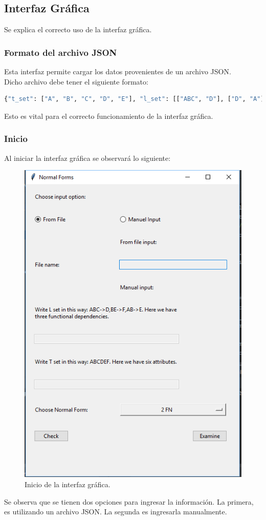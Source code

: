 \documentclass[a4paper,12pt]{article}
\begin{document}
{\subsection{Interfaz Gráfica}

Se explica el correcto uso de la interfaz gráfica.\\

\subsubsection{Formato del archivo JSON}

Esta interfaz permite cargar los datos provenientes de un archivo JSON. 
\\
Dicho archivo debe tener el siguiente formato:

\begin{lstlisting}[language=python, caption={Archivo JSON de relación de ejemplo.\\\hspace{\textwidth}}, captionpos=t]
{"t_set": ["A", "B", "C", "D", "E"], "l_set": [["ABC", "D"], ["D", "A"]]}
\end{lstlisting}

Esto es vital para el correcto funcionamiento de la interfaz gráfica.

\subsubsection{Inicio}

Al iniciar la interfaz gráfica se observará lo siguiente:

\begin{figure}[H]
\centering
  \includegraphics[width=0.3\linewidth]{Images/inicio.png}
  \caption{Inicio de la interfaz gráfica.}
  \label{fig:neurona1}
\end{figure}

Se observa que se tienen dos opciones para ingresar la información. La primera, es utilizando un archivo JSON. La segunda es ingresarla manualmente.

}
\end{document}
